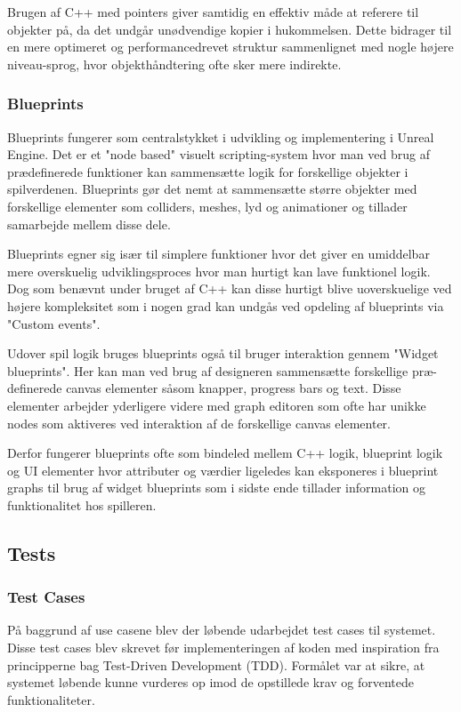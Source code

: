 Brugen af C++ med pointers giver samtidig en effektiv måde at referere til objekter på, da det undgår unødvendige kopier i hukommelsen. Dette bidrager til en mere optimeret og performancedrevet struktur sammenlignet med nogle højere niveau-sprog, hvor objekthåndtering ofte sker mere indirekte.

\subsubsection{Blueprints}
Blueprints fungerer som centralstykket i udvikling og implementering i Unreal Engine. Det er et "node based" visuelt scripting-system hvor man ved brug af prædefinerede funktioner kan sammensætte logik for forskellige objekter i spilverdenen. Blueprints gør det nemt at sammensætte større objekter med forskellige elementer som colliders, meshes, lyd og animationer og tillader samarbejde mellem disse dele. 

Blueprints egner sig især til simplere funktioner hvor det giver en umiddelbar mere overskuelig udviklingsproces hvor man hurtigt kan lave funktionel logik. Dog som benævnt under bruget af C++ kan disse hurtigt blive uoverskuelige ved højere kompleksitet som i nogen grad kan undgås ved opdeling af blueprints via "Custom events".

Udover spil logik bruges blueprints også til bruger interaktion gennem "Widget blueprints". Her kan man ved brug af designeren sammensætte forskellige præ-definerede canvas elementer såsom knapper, progress bars og text. Disse elementer arbejder yderligere videre med graph editoren som ofte har unikke nodes som aktiveres ved interaktion af de forskellige canvas elementer. 

Derfor fungerer blueprints ofte som bindeled mellem C++ logik, blueprint logik og UI elementer hvor attributer og værdier ligeledes kan eksponeres i blueprint graphs til brug af widget blueprints som i sidste ende tillader information og funktionalitet hos spilleren. 

\subsection{Tests}

\subsubsection{Test Cases}
På baggrund af use casene blev der løbende udarbejdet test cases til systemet. Disse test cases blev skrevet før implementeringen af koden med inspiration fra principperne bag Test-Driven Development (TDD). Formålet var at sikre, at systemet løbende kunne vurderes op imod de opstillede krav og forventede funktionaliteter.

